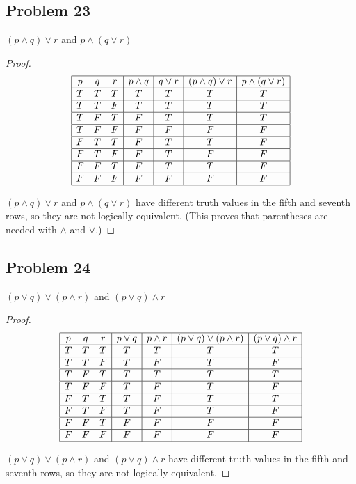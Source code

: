 \documentclass[14pt]{extarticle}
\begin{document}
\subsection{Problem 23}
$(p \wedge q) \vee r$ and $p \wedge (q \vee r)$

\begin{proof}
$$
\begin{array}{|ccc|c|c|c|c|}
\hline
p & q & r & p \wedge q & q \vee r & (p \wedge q) \vee r & p \wedge (q \vee r)
\\\hline
T & T & T & T & T & T & T \\
\hline
T & T & F & T & T & T & T \\
\hline
T & F & T & F & T & T & T \\
\hline
T & F & F & F & F & F & F \\
\hline
F & T & T & F & T & T & F \\
\hline
F & T & F & F & T & F & F \\
\hline
F & F & T & F & T & T & F \\
\hline
F & F & F & F & F & F & F \\
\hline
\end{array}
$$

$(p \wedge q) \vee r$ and $p \wedge (q \vee r)$ have different truth values in
the fifth and seventh rows, so they are not logically equivalent. (This proves
that parentheses are needed with $\wedge$ and $\vee$.)
\end{proof}

\subsection{Problem 24}
$(p \vee q) \vee (p \wedge r)$ and $(p \vee q) \wedge r$

\begin{proof}
$$
\begin{array}{|ccc|c|c|c|c|}
\hline
p & q & r & p \vee q & p \wedge r & (p \vee q) \vee (p \wedge r) &
(p \vee q) \wedge r \\
\hline
T & T & T & T & T & T & T \\
\hline
T & T & F & T & F & T & F \\
\hline
T & F & T & T & T & T & T \\
\hline
T & F & F & T & F & T & F \\
\hline
F & T & T & T & F & T & T \\
\hline
F & T & F & T & F & T & F \\
\hline
F & F & T & F & F & F & F \\
\hline
F & F & F & F & F & F & F \\
\hline
\end{array}
$$

$(p \vee q) \vee (p \wedge r)$ and $(p \vee q) \wedge r$ have different truth
values in the fifth and seventh rows, so they are not logically equivalent.
\end{proof}
\end{document}
